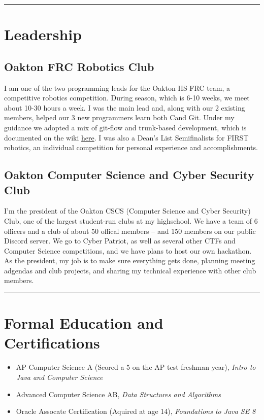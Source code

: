 \documentclass[10pt,letterpaper]{article}
\newcommand{\CPP}
{C\nolinebreak[4]\hspace{-.05em}\raisebox{.35ex}{\footnotesize\bf ++}}
\begin{document}
    \hrule
    \vspace{-0.4em}

    \section*{Leadership}
    \subsection*{Oakton FRC Robotics Club}

    I am one of the two programming leads for the Oakton HS FRC team,
    a competitive robotics competition.
    During season, which is 6-10 weeks, we meet about 10-30 hours a week.
    I was the main lead and, along with our 2 existing members,
    helped our 3 new programmers learn both \CPP and Git.
    Under my guidance we adopted a mix of git-flow and trunk-based development,
    which is documented on the wiki \href{https://github.com/CougarProgramming623/InfiniteRecharge/wiki/Git}{here}.
    I was also a Dean's List Semifinalists for FIRST robotics,
    an individual competition for personal experience and accomplishments.

    \subsection*{Oakton Computer Science and Cyber Security Club}

    I'm the president of the Oakton CSCS (Computer Science and Cyber Security) Club,
    one of the largest student-run clubs at my highschool. 
    We have a team of 6 officers and a club of about 50 offical members -- and 150 members on our public Discord server.
    We go to Cyber Patriot, as well as several other CTFs and Computer Science competitions,
    and we have plans to host our own hackathon.
    As the president, my job is to make sure everything gets done, planning meeting adgendas and club projects,
    and sharing my technical experience with other club members. 

    \vspace{1em}
    \hrule

    \section*{Formal Education and Certifications}
    \begin{itemize}
        \item AP Computer Science A (Scored a 5 on the AP test freshman year), \textit{Intro to Java and Computer Science}
        \item Advanced Computer Science AB, \textit{Data Structures and Algorithms}
        \item Oracle Assocate Certification (Aquired at age 14), \textit{Foundations to Java SE 8}
    \end{itemize}
\end{document}
